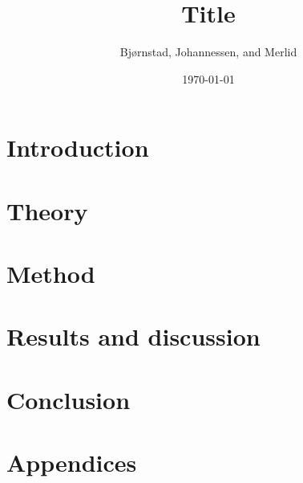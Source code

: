 \documentclass[aps,rmp,reprint,amsmath,amssymb,twocolumn,floatfix]{revtex4-1}
\begin{document}
\title{Title}

\author{Bjørnstad, Johannessen, and Merlid}
\date{\today}


\begin{abstract}

\end{abstract}
\maketitle

\tableofcontents

\section{Introduction}
\label{sec:introduction}

\section{Theory}


\section{Method}


\section{Results and discussion}


%

\section{Conclusion}


\newpage
{} %

\clearpage
\appendix
\section{Appendices}
\label{appendix}

\end{document}
